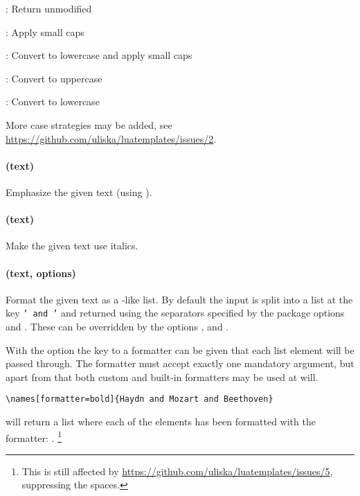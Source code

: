 \documentclass[12pt]{scrartcl}
\begin{document}
\begin{itemize*}
\item {}: Return unmodified
\item {}: Apply small caps
\item {}: Convert to lowercase and apply small caps
\item {}: Convert to uppercase
\item {}: Convert to lowercase
\end{itemize*}

\noindent More case strategies may be added, see
\url{https://github.com/uliska/luatemplates/issues/2}.

\paragraph{ (text)}

Emphasize the given text (using ).

\paragraph{ (text)}

Make the given text use italics.

\paragraph{ (text, options)}

Format the given text as a -like list.  By default the input
is split into a list at the key \texttt{' and '} and returned using the
separators specified by the package options  and
.  These can be overridden by the options
,  and .

With the option  the key to a formatter can be given that each
list element will be passed through.  The formatter must accept exactly one
mandatory argument, but apart from that both custom and built-in formatters may
be used at will.

\begin{verbatim}
\names[formatter=bold]{Haydn and Mozart and Beethoven}
\end{verbatim}

\noindent will return a list where each of the elements has been formatted with
the  formatter: .%
\footnote{This is still affected by
\url{https://github.com/uliska/luatemplates/issues/5}, suppressing the spaces.}
\end{document}
